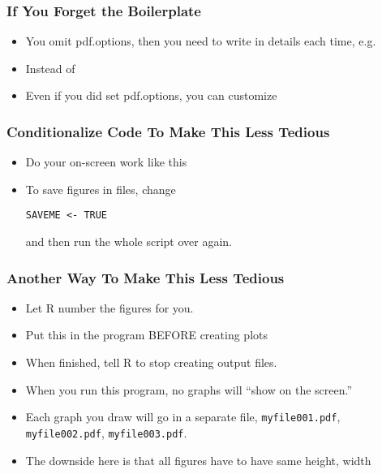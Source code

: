 \documentclass[11pt,english]{beamer}
\begin{document}


\begin{frame}[containsverbatim]
  \frametitle {If You Forget the Boilerplate}
  \begin{itemize}
  \item You omit pdf.options, then you need to write in details each time, e.g.

  

    \item Instead of

  

  \item Even if you did set pdf.options, you can customize


  

  \end{itemize}
\end{frame}




\begin{frame}[containsverbatim]
  \frametitle {Conditionalize Code To Make This Less Tedious}
  \begin{itemize}
  \item Do your on-screen work like this


    \item To save figures in files, change
    \begin{verbatim}
SAVEME <- TRUE
     \end{verbatim}

      and then run the whole script over again.
  \end{itemize}
\end{frame}


\begin{frame}[containsverbatim]
  \frametitle {Another Way To Make This Less Tedious}
  \begin{itemize}
  \item Let R number the figures for you.

  \item Put this in the program BEFORE creating plots



  \item When finished, tell R to stop creating output files.


   \item When you run this program, no graphs will ``show on the screen.''
   \item Each graph you draw will go in a separate file,
     \texttt{myfile001.pdf}, \texttt{myfile002.pdf},
     \texttt{myfile003.pdf}.

  \item The downside here is that all figures have to have same
    height, width
  \end{itemize}
\end{frame}
\end{document}

